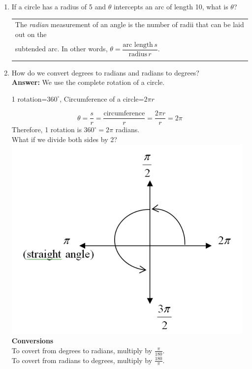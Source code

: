 \begin{enumerate}
\item If a circle has a radius of 5 and  $\theta$ intercepts an arc of length 10, what is $\theta$?\vfill

\hspace{-.35in}\begin{tabular}{ | l | }
\hline The \emph{radian} measurement of an angle is the number of radii that can be laid out on the \\ subtended arc. In other words, $\theta = \dfrac{\text{arc length}\, s}{\text{radius}\, r}$. \\ \\ \hline
\end{tabular}
\newpage

\item How do we convert degrees to radians and radians to degrees?\\
\textbf{Answer:}  We use the complete rotation of a circle.
\begin{center}
1 rotation=$360^\circ$, Circumference of a circle=$2\pi r$
\end{center}
$$\theta=\frac{s}{r}=\frac{\text{circumference}}{r}=\frac{2\pi r}{r}=2\pi$$
Therefore, 1 rotation is $360^\circ=2\pi$ radians.\\
What if we divide both sides by 2?\\[.2in]

\includegraphics[scale=.9]{radians3}\\[.3in]


\textbf{Conversions}\\
To covert from degrees to radians, multiply by $\frac{\pi}{180}$.\\[.2in]
To covert from radians to degrees, multiply by $\frac{180}{\pi}$.\\


\end{enumerate}

